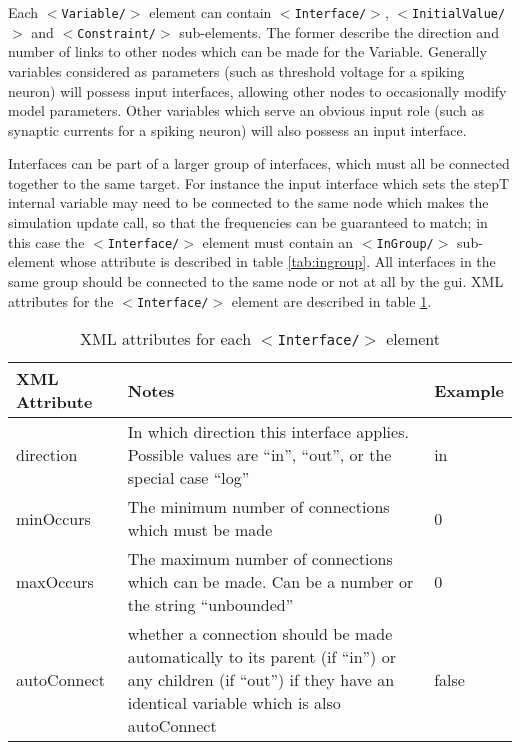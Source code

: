\documentclass[pdftex,a4paper]{article}
\newcommand{\XML}[2][]{{\tt \small $<$#2#1/$>$}}
\begin{document}
Each \XML{Variable} element can contain \XML{Interface},
\XML{InitialValue} and \XML{Constraint} sub-elements. The former
describe the direction and number of links to other nodes which can be
made for the Variable. Generally variables considered as parameters
(such as threshold voltage for a spiking neuron) will possess input
interfaces, allowing other nodes to occasionally modify model
parameters. Other variables which serve an obvious input role (such as
synaptic currents for a spiking neuron) will also possess an input
interface.

Interfaces can be part of a larger group of interfaces, which must all
be connected together to the same target. For instance the input
interface which sets the stepT internal variable may need to be
connected to the same node which makes the simulation update call, so
that the frequencies can be guaranteed to match; in this case the
\XML{Interface} element must contain an \XML{InGroup} sub-element whose
attribute is described in table \ref{tab:ingroup}. All interfaces in the
same group should be connected to the same node or not at all by the
gui. XML attributes for the \XML{Interface} element are described in
table \ref{tab:interfaces}.


\begin{table}[!h]
  \begin{center}
    \caption{XML attributes for each \XML{Interface} element}
    \label{tab:interfaces}
    \begin{tabular}{|l|p{6cm}|l|}
      \hline

      \textbf{XML Attribute} & \textbf{Notes} & \textbf{Example}\\

      \hline

      direction & In which direction this interface applies. Possible
      values are ``in'', ``out'', or the special case ``log'' & in \\

      \hline

      minOccurs & The minimum number of connections which must be made
      & 0 \\

      \hline

      maxOccurs & The maximum number of connections which can be
      made. Can be a number or the string ``unbounded'' & 0 \\

      \hline

      autoConnect & whether a connection should be made automatically
      to its parent (if ``in'') or any children (if ``out'') if they
      have an identical variable which is also autoConnect & false \\

      \hline

    \end{tabular}
  \end{center}
\end{table}
\end{document}

